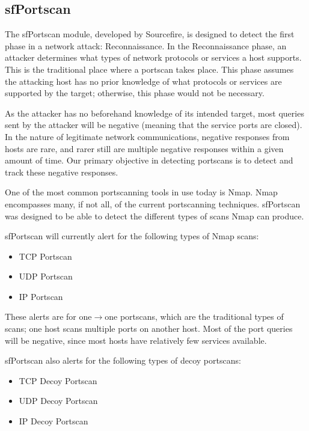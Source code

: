 \documentclass[english]{report}
\begin{document}
\subsection{sfPortscan}

The sfPortscan module, developed by Sourcefire, is designed to detect the first
phase in a network attack: Reconnaissance. In the Reconnaissance phase, an
attacker determines what types of network protocols or services a host
supports. This is the traditional place where a portscan takes place. This
phase assumes the attacking host has no prior knowledge of what protocols or
services are supported by the target; otherwise, this phase would not be
necessary.

As the attacker has no beforehand knowledge of its intended target, most
queries sent by the attacker will be negative (meaning that the service ports
are closed). In the nature of legitimate network communications, negative
responses from hosts are rare, and rarer still are multiple negative responses
within a given amount of time.  Our primary objective in detecting portscans is
to detect and track these negative responses.

One of the most common portscanning tools in use today is Nmap. Nmap
encompasses many, if not all, of the current portscanning techniques.
sfPortscan was designed to be able to detect the different types of scans Nmap
can produce.

sfPortscan will currently alert for the following types of Nmap scans:

\begin{itemize}
\item TCP Portscan
\item UDP Portscan
\item IP Portscan
\end{itemize}

These alerts are for one$\rightarrow$one portscans, which are the traditional
types of scans; one host scans multiple ports on another host. Most of the port
queries will be negative, since most hosts have relatively few services
available.

sfPortscan also alerts for the following types of decoy portscans:

\begin{itemize}
\item TCP Decoy Portscan
\item UDP Decoy Portscan
\item IP Decoy Portscan
\end{itemize}
\end{document}
